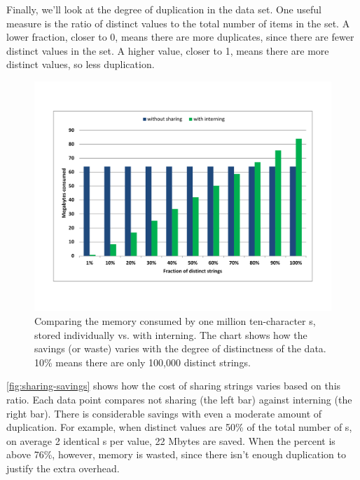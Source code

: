 Finally, we'll look at the degree of duplication in the data set. One
useful measure is the ratio of distinct values to the total number of items in the set. 
A lower fraction, closer to 0, means there are more duplicates, since
there are fewer distinct values in the set. A higher value, closer to 1, means
there are more distinct values, so less duplication. 

\begin{figure}
\centering
\includegraphics[width=\textwidth]{part1/Figures/modelingdatatypes/sharingpool_consumptionchart.pdf}
	\caption{Comparing the memory consumed by
	one million ten-character s, stored individually vs. with
	interning.
	The chart shows how the savings (or waste) varies with the degree of
	distinctness of the data. 10\%
	means there are only 100,000 distinct strings.}
	\label{fig:sharing-savings}
\end{figure}

\autoref{fig:sharing-savings} shows how the cost of sharing strings
varies based on this ratio. Each data point compares not sharing
(the left bar) against
interning (the right bar). There is considerable savings with even
a moderate amount of duplication. For example, when distinct values
are 50\% of the total number of s, on average 2 identical
s per value, 22 Mbytes are saved. When the
percent is above 76\%, however, memory is wasted, since there isn't enough duplication to justify the extra overhead.

